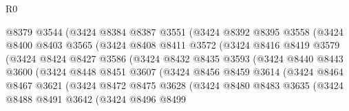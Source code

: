 \begin{lexlean}{R0}
\begin{coremodule}
                      @8379
                      @3544
                      (@3424
                        @8384
                        @8387
                        @3551
                        (@3424
                          @8392
                          @8395
                          @3558
                          (@3424
                            @8400
                            @8403
                            @3565
                            (@3424
                              @8408
                              @8411
                              @3572
                              (@3424
                                @8416
                                @8419
                                @3579
                                (@3424
                                  @8424
                                  @8427
                                  @3586
                                  (@3424
                                    @8432
                                    @8435
                                    @3593
                                    (@3424
                                      @8440
                                      @8443
                                      @3600
                                      (@3424
                                        @8448
                                        @8451
                                        @3607
                                        (@3424
                                          @8456
                                          @8459
                                          @3614
                                          (@3424
                                            @8464
                                            @8467
                                            @3621
                                            (@3424
                                              @8472
                                              @8475
                                              @3628
                                              (@3424
                                                @8480
                                                @8483
                                                @3635
                                                (@3424
                                                  @8488
                                                  @8491
                                                  @3642
                                                  (@3424
                                                    @8496
                                                    @8499

\end{coremodule}
\end{lexlean}
